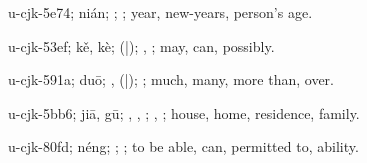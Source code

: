 \begin{multicols}{2}
{\cjkgGlue{}u-cjk-5e74; nián; \cjkgGlue{}; \cjkgGlue{}; year, new-years, person's age.

\cjkgGlue{}u-cjk-53ef; kě, kè; \cjkgGlue{}\cjkgGlue{}(\cjkgGlue{}|\cjkgGlue{}); \cjkgGlue{}, \cjkgGlue{}; may, can, possibly.

\cjkgGlue{}u-cjk-591a; duō; \cjkgGlue{}\cjkgGlue{}\cjkgGlue{}, \cjkgGlue{}\cjkgGlue{}(\cjkgGlue{}|\cjkgGlue{}); \cjkgGlue{}; much, many, more than, over.

\cjkgGlue{}u-cjk-5bb6; jiā, gū; \cjkgGlue{}, \cjkgGlue{}, \cjkgGlue{}; \cjkgGlue{}, \cjkgGlue{}; house, home, residence, family.

\cjkgGlue{}u-cjk-80fd; néng; \cjkgGlue{}\cjkgGlue{}\cjkgGlue{}; \cjkgGlue{}; to be able, can, permitted to, ability.

}
\end{multicols}
